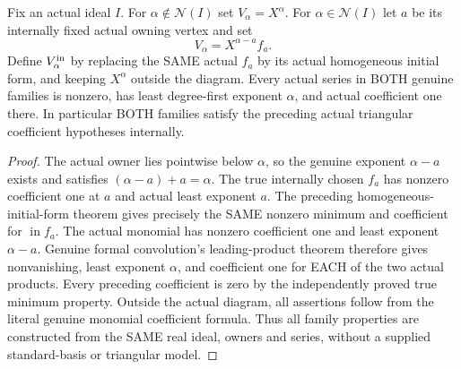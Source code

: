 \begin{theorem}
\label{hir:actual-finite-jet-owned-vertex-series-triangular}
Fix an actual ideal $I$. For $\alpha\notin\mathcal N(I)$ set
$V_\alpha=X^\alpha$. For $\alpha\in\mathcal N(I)$ let $a$ be its
internally fixed actual owning vertex and set
\[
 V_\alpha=X^{\alpha-a}f_a.
\]
Define $V^{\rm in}_\alpha$ by replacing the SAME actual $f_a$ by its
actual homogeneous initial form, and keeping $X^\alpha$ outside the
diagram. Every actual series in BOTH genuine families is nonzero,
has least degree-first exponent $\alpha$, and actual coefficient one
there. In particular BOTH families satisfy the preceding actual
triangular coefficient hypotheses internally.
\leanok
\end{theorem}
\begin{proof}
The actual owner lies pointwise below $\alpha$, so the genuine exponent
$\alpha-a$ exists and satisfies $(\alpha-a)+a=\alpha$.
The true internally chosen $f_a$ has nonzero coefficient one at $a$
and actual least exponent $a$. The preceding homogeneous-initial-form
theorem gives precisely the SAME nonzero minimum and coefficient for
$\operatorname{in}f_a$. The actual monomial has nonzero coefficient
one and least exponent $\alpha-a$. Genuine formal convolution's
leading-product theorem therefore gives nonvanishing, least exponent
$\alpha$, and coefficient one for EACH of the two actual products.
Every preceding coefficient is zero by the independently proved true
minimum property. Outside the actual diagram, all assertions follow
from the literal genuine monomial coefficient formula. Thus all family
properties are constructed from the SAME real ideal, owners and series,
without a supplied standard-basis or triangular model.
\end{proof}

